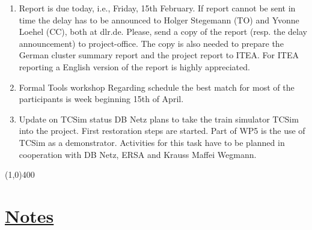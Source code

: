 \documentclass[a4paper]{article}
\begin{document}
\begin{enumerate}

\item Report is due today, i.e., Friday, 15th February.\newline
If report cannot be sent in time the delay has to be announced to Holger Stegemann (TO) and Yvonne Loehel (CC), both at dlr.de.\newline
Please, send a copy of the report (resp. the delay announcement) to project-office. The copy is also needed to prepare the German cluster summary report and the project report to ITEA. 
For ITEA reporting a English version of the report is highly appreciated.

\item Formal Tools workshop\newline
Regarding schedule the best match for most of the participants is week beginning 15th of April. 

\item Update on TCSim status\newline
DB Netz plans to take the train simulator TCSim into the project. First restoration steps are started. Part of WP5 is the use of TCSim as a demonstrator. Activities for this task have to be planned in cooperation with DB Netz, ERSA and Krauss Maffei Wegmann.

\end{enumerate}

\line(1,0){400}
\section*{\underline{Notes}}
\end{document}
